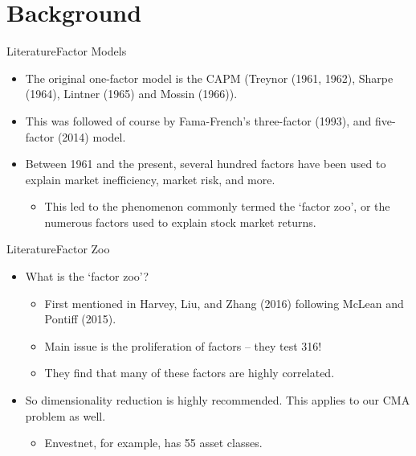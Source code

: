 \documentclass[dvipsnames,mathserif, handout]{beamer}
\begin{document}
{\section{Background}

\begin{frame}{Literature}{Factor Models}
	\begin{itemize}
		\item The original one-factor model is the CAPM (Treynor (1961, 1962), Sharpe (1964), Lintner (1965) and Mossin (1966)).
		\item This was followed of course by Fama-French's three-factor (1993), and five-factor (2014) model.
		\item Between 1961 and the present, several hundred factors have been used to explain market inefficiency, market risk, and more.
		\begin{itemize}
			\item This led to the phenomenon commonly termed the `factor zoo', or the numerous factors used to explain stock market returns.
		\end{itemize}
	\end{itemize}
\end{frame}

\begin{frame}{Literature}{Factor Zoo}
	\begin{itemize}
		\item What is the `factor zoo'?
		\begin{itemize}
			\item First mentioned in Harvey, Liu, and Zhang (2016) following McLean and Pontiff (2015).
			\item Main issue is the proliferation of factors -- they test 316!
			\item They find that many of these factors are highly correlated.
		\end{itemize}
		\item So dimensionality reduction is highly recommended. This applies to our CMA problem as well.
		\begin{itemize}
			\item Envestnet, for example, has 55 asset classes. 
		\end{itemize}
	\end{itemize}
\end{frame}

}
\end{document}
